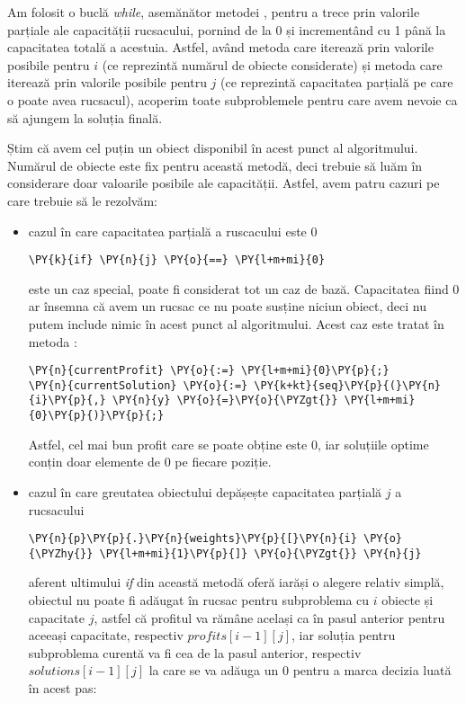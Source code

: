 \begin{sloppypar}
    Am folosit o buclă \textit{while}, asemănător metodei , pentru a trece prin valorile parțiale ale capacității rucsacului, pornind de la 0 și incrementând cu 1 până la capacitatea totală a acestuia. Astfel, având metoda  care iterează prin valorile posibile pentru $i$ (ce reprezintă numărul de obiecte considerate) și metoda  care iterează prin valorile posibile pentru $j$ (ce reprezintă capacitatea parțială pe care o poate avea rucsacul), acoperim toate subproblemele pentru care avem nevoie ca să ajungem la soluția finală. \par
    Știm că avem cel puțin un obiect disponibil în acest punct al algoritmului. Numărul de obiecte este fix pentru această metodă, deci trebuie să luăm în considerare doar valoarile posibile ale capacității. Astfel, avem patru cazuri pe care trebuie să le rezolvăm:
    \begin{itemize}
        \item cazul în care capacitatea parțială a ruscacului este 0
        \begin{Verbatim}[commandchars=\\\{\}]
                        \PY{k}{if} \PY{n}{j} \PY{o}{==} \PY{l+m+mi}{0}
\end{Verbatim}
        este un caz special, poate fi considerat tot un caz de bază. Capacitatea fiind 0 ar însemna că avem un rucsac ce nu poate susține niciun obiect, deci nu putem include nimic în acest punct al algoritmului. Acest caz este tratat în metoda :
        \begin{Verbatim}[commandchars=\\\{\}]
\PY{n}{currentProfit} \PY{o}{:=} \PY{l+m+mi}{0}\PY{p}{;}
\PY{n}{currentSolution} \PY{o}{:=} \PY{k+kt}{seq}\PY{p}{(}\PY{n}{i}\PY{p}{,} \PY{n}{y} \PY{o}{=}\PY{o}{\PYZgt{}} \PY{l+m+mi}{0}\PY{p}{)}\PY{p}{;}
\end{Verbatim}
        Astfel, cel mai bun profit care se poate obține este 0, iar soluțiile optime conțin doar elemente de 0 pe fiecare poziție.
        \item cazul în care greutatea obiectului depășește capacitatea parțială $j$ a rucsacului
        \begin{Verbatim}[commandchars=\\\{\}]
                    \PY{n}{p}\PY{p}{.}\PY{n}{weights}\PY{p}{[}\PY{n}{i} \PY{o}{\PYZhy{}} \PY{l+m+mi}{1}\PY{p}{]} \PY{o}{\PYZgt{}} \PY{n}{j}
\end{Verbatim}
        aferent ultimului \textit{if} din această metodă oferă iarăși o alegere relativ simplă, obiectul nu poate fi adăugat în rucsac pentru subproblema cu $i$ obiecte și capacitate $j$, astfel că profitul va rămâne același ca în pasul anterior pentru aceeași capacitate, respectiv $\textit{profits}[i - 1][j]$, iar soluția pentru subproblema curentă va fi cea de la pasul anterior, respectiv $\textit{solutions}[i - 1][j]$ la care se va adăuga un 0 pentru a marca decizia luată în acest pas:

\end{itemize}
\end{sloppypar}
